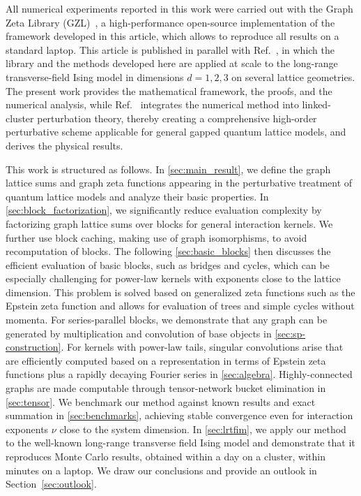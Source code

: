 \documentclass[]{amsart}
\numberwithin{mythm}{section}
\begin{document}
All numerical experiments reported in this work were carried out with the Graph Zeta Library (GZL)~\cite{gzl2026}, a high-performance open-source implementation of the framework developed in this article, which allows to reproduce all results on a standard laptop. This article is published in parallel with Ref.~\cite{duft2026}, in which the library and the methods developed here are applied at scale to the long-range transverse-field Ising model in dimensions $d=1,2,3$ on several lattice geometries. The present work provides the mathematical framework, the proofs, and the numerical analysis, while Ref.~\cite{duft2026} integrates the numerical method into linked-cluster perturbation theory, thereby creating a comprehensive high-order perturbative scheme applicable for general gapped quantum lattice models, and derives the physical results.

This work is structured as follows. In \cref{sec:main_result}, we define the graph lattice sums and graph zeta functions appearing in the perturbative treatment of quantum lattice models and analyze their basic properties. 
In \cref{sec:block_factorization}, we significantly reduce evaluation complexity by factorizing graph lattice sums over blocks for general interaction kernels. We further use block caching, making use of graph isomorphisms, to avoid recomputation of blocks. The following \cref{sec:basic_blocks} then discusses the efficient evaluation of basic blocks, such as bridges and cycles, which can be especially challenging for power-law kernels with exponents close to the lattice dimension. This problem is solved based on generalized zeta functions such as the Epstein zeta function and allows for evaluation of trees and simple cycles without momenta. For series-parallel blocks, we demonstrate that any graph can be generated by multiplication and convolution of base objects in \cref{sec:sp-construction}. For kernels with power-law tails, singular convolutions arise that are efficiently computed based on a representation in terms of Epstein zeta functions plus a rapidly decaying Fourier series in \cref{sec:algebra}. Highly-connected graphs are made computable through tensor-network bucket elimination in \cref{sec:tensor}. We benchmark our method against known results and exact summation in \cref{sec:benchmarks}, achieving stable convergence even for interaction exponents $\nu$ close to the system dimension. 
In \cref{sec:lrtfim}, we apply our method to the well-known long-range transverse field Ising model and demonstrate that it reproduces Monte Carlo results, obtained within a day on a cluster, within minutes on a laptop. We draw our conclusions and provide an outlook in Section~\ref{sec:outlook}. 
\end{document}
